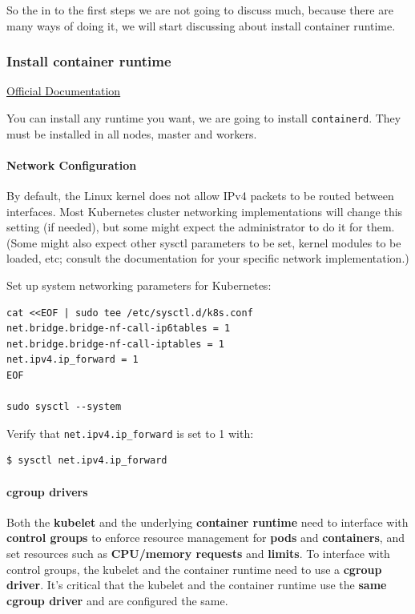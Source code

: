 \documentclass{article}
\newenvironment{codetemplate}[1][]{%
  \mybasecolorbox[#1]
  \itshape
}{%
  \endmybasecolorbox
}
\begin{document}
So the in to the first steps we are not going to discuss much, because there are many ways of doing it, we will start discussing about install container runtime.

\subsubsection{Install container runtime}
\href{https://kubernetes.io/docs/setup/production-environment/container-runtimes/}{Official Documentation}

You can install any runtime you want, we are going to install \verb|containerd|. They must be installed in all nodes, master and workers.

\paragraph{Network Configuration}
By default, the Linux kernel does not allow IPv4 packets to be routed between interfaces. Most Kubernetes cluster networking implementations will change this setting (if needed), but some might expect the administrator to do it for them. (Some might also expect other sysctl parameters to be set, kernel modules to be loaded, etc; consult the documentation for your specific network implementation.)

Set up system networking parameters for Kubernetes:
\begin{codetemplate}{}
\begin{verbatim}
cat <<EOF | sudo tee /etc/sysctl.d/k8s.conf
net.bridge.bridge-nf-call-ip6tables = 1
net.bridge.bridge-nf-call-iptables = 1
net.ipv4.ip_forward = 1
EOF

sudo sysctl --system
\end{verbatim}
\end{codetemplate}

Verify that \verb|net.ipv4.ip_forward| is set to 1 with:
\begin{codetemplate}{}
\begin{verbatim}
$ sysctl net.ipv4.ip_forward
\end{verbatim}
\end{codetemplate}

\paragraph{cgroup drivers}
Both the \textbf{kubelet} and the underlying \textbf{container runtime} need to interface with \textbf{control groups} to enforce resource management for \textbf{pods} and \textbf{containers}, and set resources such as \textbf{CPU/memory requests} and \textbf{limits}. To interface with control groups, the kubelet and the container runtime need to use a \textbf{cgroup driver}. It's critical that the kubelet and the container runtime use the \textbf{same cgroup driver} and are configured the same.
\end{document}
